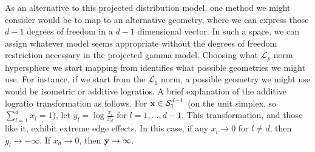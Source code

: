 
As an alternative to this projected distribution model, one method we might consider would be to map
  to an alternative geometry, where we can express those $d-1$ degrees of freedom in a $d-1$
  dimensional vector.  In such a space, we can assign whatever model seems appropriate without the
  degrees of freedom restriction necessary in the projected gamma model.  Choosing what $\mathcal{L}_p$
  norm hypersphere we start mapping from identifies what possible geometries we might use.  For instance,
  if we start from the $\mathcal{L}_1$ norm, a possible geometry we might use would be isometric or
  additive logratios\cite{aitchison1982}.  A brief explanation of the additive logratio transformation
  as follows.  For ${\bf x}\in \mathcal{S}_{1}^{d-1}$ (on the unit simplex, so $\sum_{l = 1}^d x_l = 1$),
  let $y_l = \log\frac{x_l}{x_d}$ for $l = 1,\ldots,d-1$. This transformation, and those like it,
  exhibit extreme edge effects.  In this case, if any $x_l\to0$ for $l \neq d$, then $y_l\to-\infty$.
  If $x_d \to 0$, then ${\bf y}\to\infty$. 

